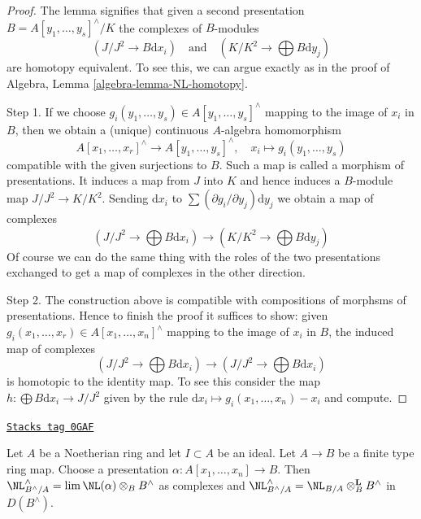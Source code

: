 \begin{proof}
The lemma signifies that given a second presentation
$B = A[y_1, \ldots, y_s]^\wedge / K$ the complexes of $B$-modules
$$
(J/J^2 \to B\text{d}x_i)
\quad\text{and}\quad
(K/K^2 \to \bigoplus B\text{d}y_j)
$$
are homotopy equivalent. To see this, we can argue exactly as in
the proof of Algebra, Lemma \ref{algebra-lemma-NL-homotopy}.

\medskip\noindent
Step 1. If we choose $g_i(y_1, \ldots, y_s) \in A[y_1, \ldots, y_s]^\wedge$
mapping to the image of $x_i$ in $B$, then we obtain a (unique) continuous
$A$-algebra homomorphism
$$
A[x_1, \ldots, x_r]^\wedge \to A[y_1, \ldots, y_s]^\wedge,\quad
x_i \mapsto g_i(y_1, \ldots, y_s)
$$
compatible with the given surjections to $B$. Such a map is called
a morphism of presentations. It induces a map from $J$ into $K$
and hence induces a $B$-module map $J/J^2 \to K/K^2$. Sending
$\text{d}x_i$ to $\sum (\partial g_i/\partial y_j)\text{d}y_j$
we obtain a map of complexes
$$
(J/J^2 \to \bigoplus B\text{d}x_i)
\longrightarrow
(K/K^2 \to \bigoplus B\text{d}y_j)
$$
Of course we can do the same thing with the roles of the two presentations
exchanged to get a map of complexes in the other direction.

\medskip\noindent
Step 2. The construction above is compatible with compositions of morphsms
of presentations. Hence to finish the proof it suffices to show: given
$g_i(x_1, \ldots, x_r) \in A[x_1, \ldots, x_n]^\wedge$
mapping to the image of $x_i$ in $B$, the induced map of complexes
$$
(J/J^2 \to \bigoplus B\text{d}x_i)
\longrightarrow
(J/J^2 \to \bigoplus B\text{d}x_i)
$$
is homotopic to the identity map. To see this consider the map
$h : \bigoplus B \text{d}x_i \to J/J^2$ given by the rule
$\text{d}x_i \mapsto g_i(x_1, \ldots, x_n) - x_i$ and compute.
\end{proof}

\begin{lemma}[NL is completion]
\label{restricted-lemma-NL-is-completion}
\href{https://stacks.math.columbia.edu/tag/0GAF}{\texttt{Stacks tag 0GAF}}

Let $A$ be a Noetherian ring and let $I \subset A$ be an ideal.
Let $A \to B$ be a finite type ring map. Choose a presentation
$\alpha : A[x_1, \ldots, x_n] \to B$. Then
$\NL_{B^\wedge/A}^\wedge = \lim \NL(\alpha) \otimes_B B^\wedge$
as complexes and
$\NL_{B^\wedge/A}^\wedge = \NL_{B/A} \otimes_B^\mathbf{L} B^\wedge$
in $D(B^\wedge)$.
\end{lemma}

